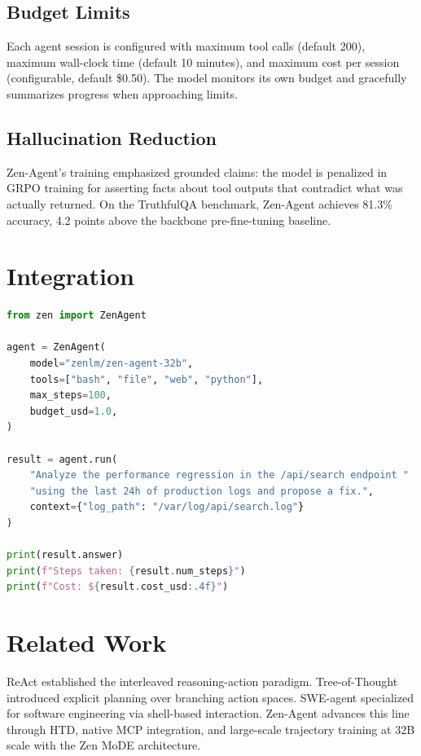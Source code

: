 \documentclass[11pt,a4paper]{article}
\begin{document}
\subsection{Budget Limits}

Each agent session is configured with maximum tool calls (default 200), maximum wall-clock
time (default 10 minutes), and maximum cost per session (configurable, default \$0.50).
The model monitors its own budget and gracefully summarizes progress when approaching limits.

\subsection{Hallucination Reduction}

Zen-Agent's training emphasized grounded claims: the model is penalized in GRPO training for
asserting facts about tool outputs that contradict what was actually returned. On the
TruthfulQA benchmark, Zen-Agent achieves 81.3\% accuracy, 4.2 points above the backbone
pre-fine-tuning baseline.

\section{Integration}

\begin{lstlisting}[language=Python, caption=Zen-Agent Task Execution]
from zen import ZenAgent

agent = ZenAgent(
    model="zenlm/zen-agent-32b",
    tools=["bash", "file", "web", "python"],
    max_steps=100,
    budget_usd=1.0,
)

result = agent.run(
    "Analyze the performance regression in the /api/search endpoint "
    "using the last 24h of production logs and propose a fix.",
    context={"log_path": "/var/log/api/search.log"}
)

print(result.answer)
print(f"Steps taken: {result.num_steps}")
print(f"Cost: ${result.cost_usd:.4f}")
\end{lstlisting}

\section{Related Work}

ReAct \cite{yao2022react} established the interleaved reasoning-action paradigm.
Tree-of-Thought \cite{yao2023tree} introduced explicit planning over branching action spaces.
SWE-agent \cite{yang2024swe} specialized for software engineering via shell-based interaction.
Zen-Agent advances this line through HTD, native MCP integration, and large-scale trajectory
training at 32B scale with the Zen MoDE architecture.
\end{document}
